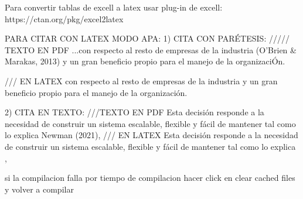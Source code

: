 Para convertir tablas de excell a latex usar plug-in de excell:
https://ctan.org/pkg/excel2latex

PARA CITAR CON LATEX MODO APA:
1) CITA CON PARÉTESIS:
///// TEXTO EN PDF
...con respecto al resto de empresas de la industria (O’Brien & Marakas, 2013) y un gran beneficio propio para el manejo de la organizaciÓn.

/// EN LATEX
con respecto al resto de empresas de la industria \parencite{obrien2013mis} y un gran beneficio propio para el manejo de la organización.

2) CITA EN TEXTO:
///TEXTO EN PDF
Esta decisión responde a la necesidad de construir un sistema escalable, flexible y fácil de mantener tal como lo explica Newman (2021),
/// EN LATEX
Esta decisión responde a la necesidad de construir un sistema escalable, flexible y fácil de mantener tal como lo explica \textcite{newman2021microservices},

si la compilacion falla por tiempo de compilacion hacer click en clear cached files y volver a compilar